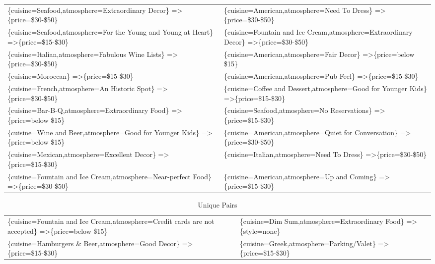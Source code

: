 \documentclass[letterpaper,10pt]{article}
\begin{document}
\begin{appendices}
\begin{table}[h]
\begin{adjustbox}{max width=\textwidth}
\begin{tabular}{ll}
\{cuisine=Seafood,atmosphere=Extraordinary Decor\} =\textgreater \{price=\$30-\$50\} & \{cuisine=American,atmosphere=Need To Dress\} =\textgreater \{price=\$30-\$50\} \\
\{cuisine=Seafood,atmosphere=For the Young and Young at Heart\} =\textgreater \{price=\$15-\$30\} & \{cuisine=Fountain and Ice Cream,atmosphere=Extraordinary Decor\} =\textgreater \{price=\$30-\$50\} \\
\{cuisine=Italian,atmosphere=Fabulous Wine Lists\} =\textgreater \{price=\$30-\$50\} & \{cuisine=American,atmosphere=Fair Decor\} =\textgreater \{price=below \$15\} \\
\{cuisine=Moroccan\} =\textgreater \{price=\$15-\$30\} & \{cuisine=American,atmosphere=Pub Feel\} =\textgreater \{price=\$15-\$30\} \\
\{cuisine=French,atmosphere=An Historic Spot\} =\textgreater \{price=\$30-\$50\} & \{cuisine=Coffee and Dessert,atmosphere=Good for Younger Kids\} =\textgreater \{price=\$15-\$30\} \\
\{cuisine=Bar-B-Q,atmosphere=Extraordinary Food\} =\textgreater \{price=below \$15\} & \{cuisine=Seafood,atmosphere=No Reservations\} =\textgreater \{price=\$15-\$30\} \\
\{cuisine=Wine and Beer,atmosphere=Good for Younger Kids\} =\textgreater \{price=below \$15\} & \{cuisine=American,atmosphere=Quiet for Conversation\} =\textgreater \{price=\$30-\$50\} \\
\{cuisine=Mexican,atmosphere=Excellent Decor\} =\textgreater \{price=\$15-\$30\} & \{cuisine=Italian,atmosphere=Need To Dress\} =\textgreater \{price=\$30-\$50\} \\
\{cuisine=Fountain and Ice Cream,atmosphere=Near-perfect Food\} =\textgreater \{price=\$30-\$50\} & \{cuisine=American,atmosphere=Up and Coming\} =\textgreater \{price=\$15-\$30\} \\
\end{tabular}
\end{adjustbox}
\end{table}
\begin{table}[h]
\caption*{Unique Pairs}
\begin{adjustbox}{max width=\textwidth}
\begin{tabular}{ll}
\{cuisine=Fountain and Ice Cream,atmosphere=Credit cards are not accepted\} =\textgreater \{price=below \$15\} & \{cuisine=Dim Sum,atmosphere=Extraordinary Food\} =\textgreater \{style=none\} \\
\{cuisine=Hamburgers \& Beer,atmosphere=Good Decor\} =\textgreater \{price=\$15-\$30\} & \{cuisine=Greek,atmosphere=Parking/Valet\} =\textgreater \{price=\$15-\$30\} \\

\end{tabular}
\end{adjustbox}
\end{table}
\end{appendices}
\end{document}
